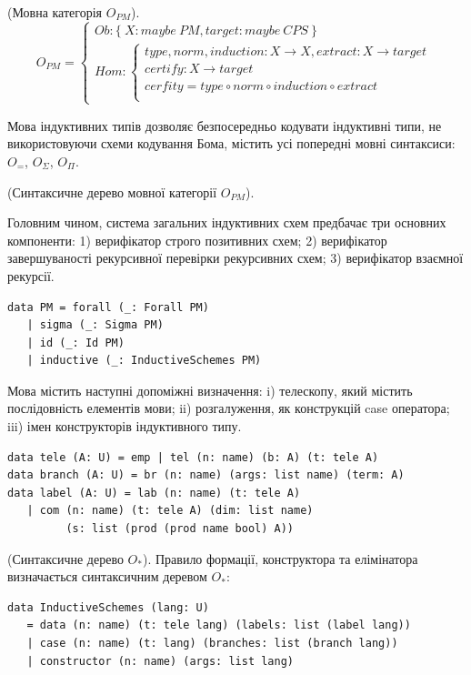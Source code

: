\begin{definition} (Мовна категорія $O_{PM}$).
\begin{equation}
O_{PM} =
\begin{cases}
Ob: \{\ X: maybe\ PM, target: maybe\ CPS\ \} \\
Hom: \begin{cases}
type,norm,induction: X \rightarrow X, extract: X \rightarrow target \\
certify : X \rightarrow target \\
cerfity = type \circ norm \circ induction \circ extract \\
\end{cases}
\end{cases}
\end{equation}
\end{definition}

Мова індуктивних типів дозволяє безпосередньо кодувати індуктивні типи,
не використовуючи схеми кодування Бома, містить усі попередні мовні синтаксиси:
$O_=$, $O_\Sigma$, $O_\Pi$.

\begin{definition} (Синтаксичне дерево мовної категорії $O_{PM}$).

Головним чином, система загальних індуктивних схем предбачає три основних компоненти:
1) верифікатор строго позитивних схем;
2) верифікатор завершуваності рекурсивної перевірки рекурсивних схем;
3) верифікатор взаємної рекурсії.

\begin{lstlisting}
data PM = forall (_: Forall PM)
   | sigma (_: Sigma PM)
   | id (_: Id PM)
   | inductive (_: InductiveSchemes PM)
\end{lstlisting}
\end{definition}

Мова містить наступні допоміжні визначення: i) телескопу,
який містить послідовність елементів мови; ii) розгалуження,
як конструкцій case оператора; iii) імен конструкторів індуктивного типу.

\begin{lstlisting}
data tele (A: U) = emp | tel (n: name) (b: A) (t: tele A)
data branch (A: U) = br (n: name) (args: list name) (term: A)
data label (A: U) = lab (n: name) (t: tele A)
   | com (n: name) (t: tele A) (dim: list name)
         (s: list (prod (prod name bool) A))
\end{lstlisting}

\begin{definition} (Синтаксичне дерево $O_{*}$).
Правило формації, конструктора та елімінатора визначається синтаксичним деревом $O_{*}$:
\begin{lstlisting}
data InductiveSchemes (lang: U)
   = data (n: name) (t: tele lang) (labels: list (label lang))
   | case (n: name) (t: lang) (branches: list (branch lang))
   | constructor (n: name) (args: list lang)
\end{lstlisting}
\end{definition}

